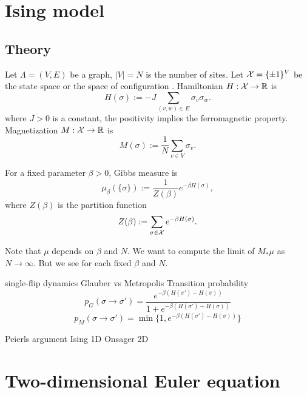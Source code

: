 \documentclass{report}
\begin{document}
\chapter*{Ising model}
\section{Theory}
Let $\Lambda=(V,E)$ be a graph, $|V|=N$ is the number of sites.
Let $\mathcal{X}=\{\pm1\}^V$ be the state space or the space of configuration .
Hamiltonian $H:\mathcal{X}\to\mathbb{R}$ is
\[H(\sigma):=-J\sum_{(v,w)\in E}\sigma_v\sigma_w.\]
where $J>0$ is a constant, the positivity implies the ferromagnetic property.
Magnetization $M:\mathcal{X}\to\mathbb{R}$ is
\[M(\sigma):=\frac1N\sum_{v\in V}\sigma_v.\]

For a fixed parameter $\beta>0$,
Gibbs measure is
\[\mu_\beta(\{\sigma\}):=\frac1{Z(\beta)}e^{-\beta H(\sigma)},\]
where $Z(\beta)$ is the partition function
\[Z(\beta):=\sum_{\sigma\in\mathcal{X}}e^{-\beta H(\sigma)}.\]


Note that $\mu$ depends on $\beta$ and $N$.
We want to compute the limit of $M_*\mu$ as $N\to\infty$.
But we see for each fixed $\beta$ and $N$.


single-flip dynamics
Glauber vs Metropolis
Transition probability
\[p_G(\sigma\to\sigma')=\frac{e^{-\beta(H(\sigma')-H(\sigma))}}{1+e^{-\beta(H(\sigma')-H(\sigma))}}\]
\[p_M(\sigma\to\sigma')=\min\{1,e^{-\beta(H(\sigma')-H(\sigma))}\}\]


Peierls argument
Ising 1D
Onsager 2D



\chapter*{Two-dimensional Euler equation}
\end{document}
